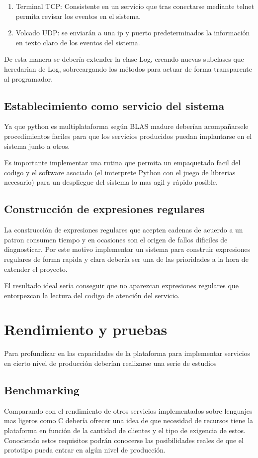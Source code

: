 \documentclass[a4paper,spanish,12pt]{book}
\begin{document}
\begin{enumerate}
	\item{Terminal TCP: Consistente en un servicio que tras conectarse mediante telnet permita revisar los eventos en el sistema.}
	\item{Volcado UDP: se enviarán a una ip y puerto predeterminados la información en texto claro de los eventos del sistema.}
\end{enumerate}

De esta manera se debería extender la clase Log, creando nuevas subclases que heredarian de Log, sobrecargando los m\'etodos para actuar de forma transparente al programador.


\subsection{Establecimiento como servicio del sistema}
Ya que python es multiplataforma según BLAS madure deberían acompañarsele procedimientos faciles para que los servicios producidos puedan implantarse en el sistema junto a otros.

Es importante implementar una rutina que permita un empaquetado facil del codigo y el software asociado (el imterprete Python con el juego de librerias necesario) para un despliegue del sistema lo mas agil y rápido posible.

\subsection{Construcción de expresiones regulares}
La construcción de expresiones regulares que acepten cadenas de acuerdo a un patron consumen tiempo y en ocasiones son el origen de fallos dificiles de diagnosticar. Por este motivo implementar un sistema para construir expresiones regulares de forma rapida y clara debería ser una de las prioridades a la hora de extender el proyecto.

El resultado ideal sería conseguir que no aparezcan expresiones regulares que entorpezcan la lectura del codigo de atención del servicio.
\section{Rendimiento y pruebas}
Para profundizar en las capacidades de la plataforma para implementar servicios en cierto nivel de producción deberían realizarse una serie de estudios
\subsection{Benchmarking}
Comparando con el rendimiento de otros servicios implementados sobre lenguajes mas ligeros como C debería ofrecer una idea de que necesidad de recursos tiene la plataforma en función de la cantidad de clientes y el tipo de exigencia de estos. Conociendo estos requisitos podrán conocerse las posibilidades reales de que el prototipo pueda entrar en algún nivel de producción.
\end{document}
